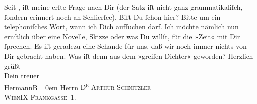 \begin{ledgroupsized}[t]{13cm}
           Seit \label{K_L00583_1v}\label{K_L00583_1h}, iſt meine erſte Frage nach Dir (der Satz iſt nicht ganz
               grammatikaliſch, ſondern erinnert noch an Schlierſee). Biſt Du ſchon hier? Bitte um ein telephoniſches Wort, wann ich
               Dich aufſuchen darf. Ich möchte nämlich nun ernſtlich über eine Novelle, Skizze oder
               was Du {\pb}willſt, für die »Zeit« mit Dir ſprechen. Es iſt geradezu eine Schande für
               uns, daß wir noch immer nichts von Dir gebracht haben. Was iſt denn aus dem »greiſen Dichter« geworden?\pend
           \pstart
           Herzlich grüßt{\\[\baselineskip]}Dein treuer{\\[\baselineskip]}\spacefill\mbox{HermannB}\pend
           \leftskip=0em{}\pstart
           \noindent{}Herrn \textsc{D\textsuperscript{r} Arthur Schnitzler}{\\}\textsc{WienIX Frankgasse 1}.\pend
           \pstart
           \textcolor{gray}{\textbf{\label{T_L00583_1v}\label{T_L00583_1h}}}\pend
           
         
         \endnumbering{}\end{ledgroupsized}  \newcommand{\dateiname}{L00583}\newcommand{\titel}{Hermann Bahr an Arthur Schnitzler, 2. 9. 1896}\newcommand{\editorInnen}{ Kurt Ifkovits,  Martin Anton Müller}
      